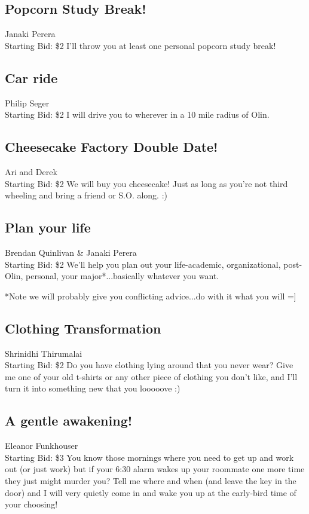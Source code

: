 \documentclass[11pt]{article}
\begin{document}
\subsection{Popcorn Study Break!}
Janaki Perera
\\
Starting Bid: \$2
\newline
I'll throw you at least one personal popcorn study break!
\subsection{Car ride}
Philip Seger
\\
Starting Bid: \$2
\newline
I will drive you to wherever in a 10 mile radius of Olin.
\subsection{Cheesecake Factory Double Date!}
Ari and Derek
\\
Starting Bid: \$2
\newline
We will buy you cheesecake! Just as long as you're not third wheeling and bring a friend or S.O. along. :)
\subsection{Plan your life}
Brendan Quinlivan \& Janaki Perera
\\
Starting Bid: \$2
\newline
We'll help you plan out your life-academic, organizational, post-Olin, personal, your major*...basically whatever you want.

*Note we will probably give you conflicting advice...do with it what you will =]
\subsection{Clothing Transformation}
Shrinidhi Thirumalai
\\
Starting Bid: \$2
\newline
Do you have clothing lying around that you never wear? Give me one of your old t-shirts or any other piece of clothing you don't like, and I'll turn it into something new that you looooove :)
\subsection{A gentle awakening!}
Eleanor Funkhouser
\\
Starting Bid: \$3
\newline
You know those mornings where you need to get up and work out (or just work) but if your 6:30 alarm wakes up your roommate one more time they just might murder you? Tell me where and when (and leave the key in the door) and I will very quietly come in and wake you up at the early-bird time of your choosing!
\end{document}
